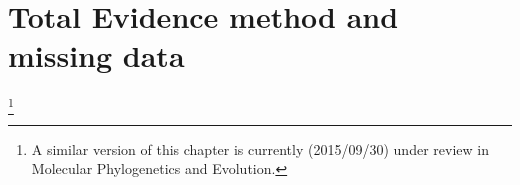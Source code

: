

%
%

\chapter[Total Evidence method and missing data]{Total Evidence method and missing data}
\label{chap:TEM_paper}

\bigskip
\medskip
\begin{center}

\footnote{A similar version of this chapter is currently (2015/09/30) under review in Molecular Phylogenetics and Evolution.} \\

\end{center}
%
%
